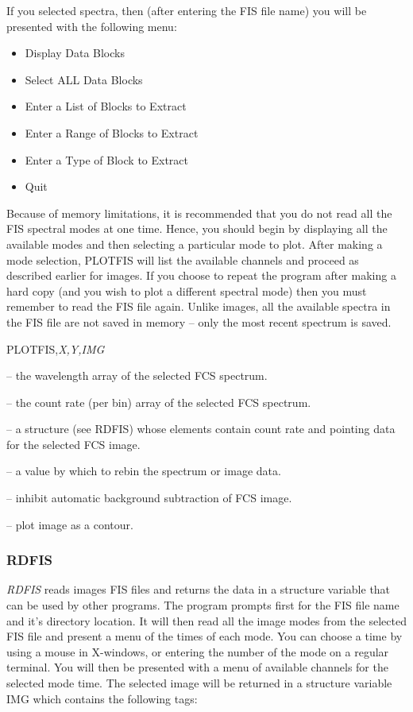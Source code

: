{{{If you selected spectra, then (after entering the FIS file name)
you will be presented with the following menu:
\begin{itemize}
\item  Display Data Blocks
\item  Select ALL Data Blocks
\item  Enter a List of Blocks to Extract
\item  Enter a Range of Blocks to Extract
\item  Enter a Type of Block to Extract
\item  Quit
\end{itemize}
\noindent Because of memory limitations, it is recommended that you do not read
all the FIS spectral modes at one time.  Hence, you should begin by displaying
all the available modes and then selecting a particular mode to plot. After
making a mode selection, PLOTFIS will list the available channels and proceed
as described earlier for images. If you choose to repeat the program after
making a hard copy (and you wish to plot a different spectral mode) then you
must remember to read the FIS file again. Unlike images, all the available
spectra in the FIS file are not saved in memory -- only the most recent
spectrum is saved.


\noindent PLOTFIS,{\it X,Y,IMG}


 -- the wavelength array of the selected FCS spectrum.

 -- the count rate (per bin) array of the selected FCS spectrum.

 -- a structure (see RDFIS) whose elements contain count
rate and pointing data for the selected FCS image.


 -- a value by which to rebin the spectrum or image data.

 -- inhibit automatic background subtraction of FCS image.

 -- plot image as a contour.

\subsubsection{RDFIS}

{\em RDFIS} reads images FIS files and returns the data in a structure variable that
can be used by other programs. The program prompts first for the FIS file name
and it's directory location.  It will then read all the image modes from the
selected FIS file and present a menu of the times of each mode.  You can choose
a time by using a mouse in X-windows, or entering the number of the mode on a
regular terminal. You will then be presented with a menu of available channels
for the selected mode time.  The selected image will be returned in a structure
variable  IMG which contains the following tags:

}}}
